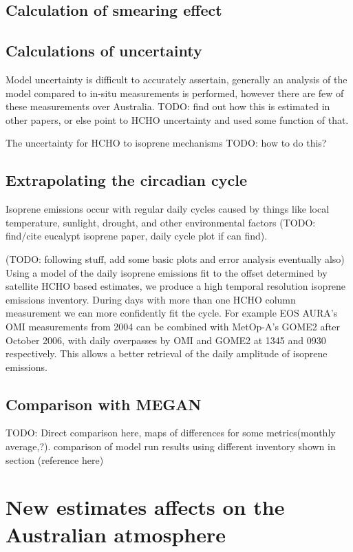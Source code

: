   \subsection{Calculation of smearing effect}
  \subsection{Calculations of uncertainty}
    

    
    
    Model uncertainty is difficult to accurately assertain, generally an analysis of the model compared to in-situ measurements is performed, however there are few of these measurements over Australia.
    TODO: find out how this is estimated in other papers, or else point to HCHO uncertainty and used some function of that.
    
    The uncertainty for HCHO to isoprene mechanisms TODO: how to do this?
  
  \subsection{Extrapolating the circadian cycle}
    Isoprene emissions occur with regular daily cycles caused by things like local temperature, sunlight, drought, and other environmental factors (TODO: find/cite eucalypt isoprene paper, daily cycle plot if can find).
    
    (TODO: following stuff, add some basic plots and error analysis eventually also)
    Using a model of the daily isoprene emissions fit to the offset determined by satellite HCHO based estimates, we produce a high temporal resolution isoprene emissions inventory.
    During days with more than one HCHO column measurement we can more confidently fit the cycle. 
    For example EOS AURA's OMI measurements from 2004 can be combined with MetOp-A's GOME2 after October 2006, with daily overpasses by OMI and GOME2 at 1345 and 0930 respectively.
    This allows a better retrieval of the daily amplitude of isoprene emissions.
    
  \subsection{Comparison with MEGAN}
    TODO: Direct comparison here, maps of differences for some metrics(monthly average,?). comparison of model run results using different inventory shown in section (reference here)

\section{New estimates affects on the Australian atmosphere}

